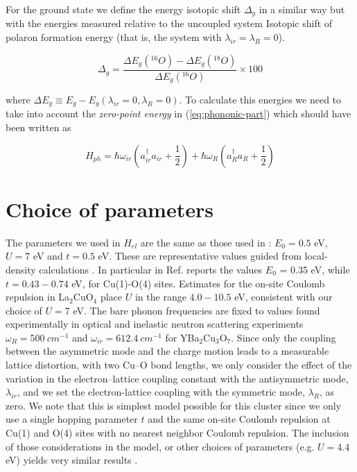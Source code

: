 For the ground state we define the energy isotopic shift $\Delta_g$ in a similar way but with the energies measured relative to the uncoupled system Isotopic shift of polaron formation energy (that is, the system with $\lambda_{ir}=\lambda_R=0$).

\begin{equation}\label{eq:isot-shift-def-grd}
\Delta_g = \frac{\Delta E_g(^{16}O)- \Delta E_g(^{18}O)}{\Delta E_g(^{16}O)} \times 100
\end{equation}

where $\Delta E_g \equiv E_g - E_g(\lambda_{ir}=0, \lambda_R=0)$. To calculate this energies we need to take into account the \textit{zero-point energy} in (\ref{eq:phononic-part}) which should have been written as 

\begin{equation}\label{eq:phononic-part-complete}
H_{ph} = \hbar \omega_{ir} \left( a_{ir}^\dagger a_{ir} + \frac{1}{2}\right) + \hbar \omega_R\left( a_R^\dagger a_R + \frac{1}{2} \right)
\end{equation}


\section{Choice of parameters}

The parameters we used in $H_{el}$  are the same as those used in \cite{Mena2006}: $E_0=0.5$ eV, $U=7$ eV and $t=0.5$ eV. These are representative values guided from local-density calculations \cite{Pickett1989}. In particular in Ref. \cite{DeWeert1989} reports the values $E_0$ = 0.35 eV, while $t=0.43-0.74$ eV, for Cu(1)-O(4) sites. Estimates for the on-site Coulomb repulsion in La$_2$CuO$_4$ place $U$ in the range $4.0-10.5$ eV, \cite{Hybertsen1989} consistent with our choice of $U=$7 eV.  The bare phonon frequencies are fixed to values found experimentally in optical and inelastic neutron scattering experiments $\omega_R = 500\ cm^{-1}$ and $\omega_{ir} = 612.4\ cm^{-1}$ for YBa$_2$Cu$_3$O$_7$. Since only the coupling between the asymmetric mode and the charge motion leads to a measurable lattice distortion, with two Cu–O bond lengths, we only consider the effect of the variation in the electron–lattice coupling constant with the antisymmetric mode, $\lambda_{ir}$,  and we set the electron-lattice coupling with the symmetric mode, $\lambda_R$, as zero. We note that this is simplest model possible for this cluster since we only use a single hopping parameter $t$ and the same on-site Coulomb repulsion at Cu(1) and O(4) sites with no nearest neighbor Coulomb repulsion. The inclusion of those considerations in the model, or other choices of parameters (e.g. $U = $4.4 eV) yields very similar results \cite{Salkola1994}.

